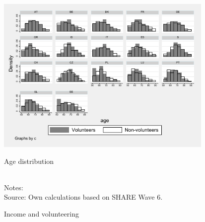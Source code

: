 \documentclass[10pt, letterpaper]{article}
\begin{document}
\begin{spacing}{1.4}
\begin{spacing}{.9}
\begin{figure}[H]
 \includegraphics[height=3in]{hist_age.pdf}
 \centering
 \label{fig:hist_age}
\caption{Age distribution}
\end{figure}


\begin{figure}[H]
\centering
\caption{Income and volunteering} 
\label{fig:casp_ols}
\begin{minipage}{1\linewidth}
\quad
{}~\\ 
{\footnotesize Notes: }~\\
{\footnotesize Source: Own calculations based on SHARE Wave 6.}
\end{minipage}
\end{figure} 


\end{spacing}
\end{spacing}
\end{document}
